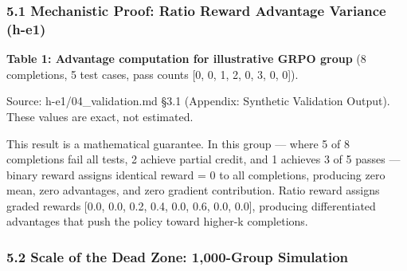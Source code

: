 
\subsubsection{5.1 Mechanistic Proof: Ratio Reward Advantage Variance (h-e1)}

\textbf{Table 1: Advantage computation for illustrative GRPO group} (8 completions, 5 test cases, pass counts [0, 0, 1, 2, 0, 3, 0, 0]).

\begin{table}[htbp]
\centering
{}
\end{table}

Source: h-e1/04\_validation.md §3.1 (Appendix: Synthetic Validation Output). These values are exact, not estimated.

This result is a mathematical guarantee. In this group --- where 5 of 8 completions fail all tests, 2 achieve partial credit, and 1 achieves 3 of 5 passes --- binary reward assigns identical reward = 0 to all completions, producing zero mean, zero advantages, and zero gradient contribution. Ratio reward assigns graded rewards [0.0, 0.0, 0.2, 0.4, 0.0, 0.6, 0.0, 0.0], producing differentiated advantages that push the policy toward higher-k completions.

\subsubsection{5.2 Scale of the Dead Zone: 1,000-Group Simulation}

